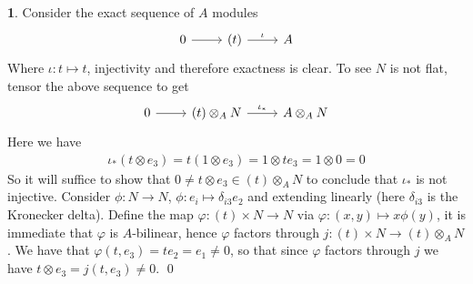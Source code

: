 \documentclass[11pt]{article}
\theoremstyle{definition}
\newtheorem{pb}{}
\begin{document}
    \begin{pb}
        \color{red}
        Consider the exact sequence of \(A\) modules
        \begin{equation*}
            \begin{tikzcd}
                0 \arrow[r,"{}"] &(t) \arrow[r,"{\iota}"] & A
            \end{tikzcd}
        \end{equation*}
        Where \(\iota: t\mapsto t\), injectivity and therefore exactness is clear. To see \(N\) is not flat, tensor the above sequence to get
        \begin{equation*}
            \begin{tikzcd}
                0 \arrow[r,"{}"] &(t)\otimes_A N \arrow[r,"{\iota_*}"] &A \otimes_A N
            \end{tikzcd}
        \end{equation*}
        Here we have
        \begin{align*}
            \iota_*(t\otimes e_3) = t(1\otimes e_3) = 1\otimes t e_3 = 1 \otimes 0 = 0
        \end{align*}
        So it will suffice to show that \(0 \neq t \otimes e_3 \in (t)\otimes_A N\) to conclude that \(\iota_*\) is not injective. Consider \(\phi: N \to N\), \(\phi: e_i \mapsto \delta_{i3}e_2\) and extending linearly (here \(\delta_{i3}\) is the Kronecker delta). Define the map \(\varphi: (t) \times N \to N\) via \(\varphi: (x,y) \mapsto x\phi(y)\), it is immediate that \(\varphi\) is \(A\)-bilinear, hence \(\varphi\) factors through \(j: (t)\times N \to (t)\otimes_A N\). We have that \(\varphi(t,e_3) = te_2 = e_1 \neq 0\), so that since \(\varphi\) factors through \(j\) we have \(t \otimes e_3 = j(t,e_3) \neq 0\). \qed
        \color{blue}


\end{pb}
\end{document}
